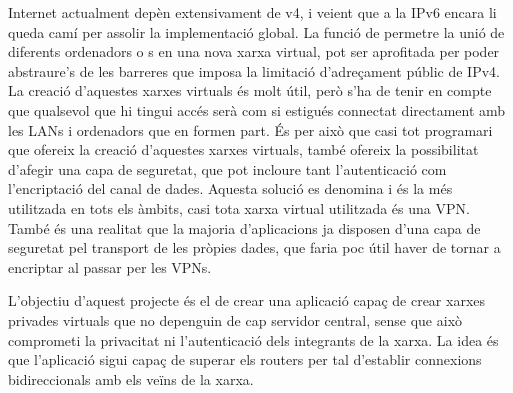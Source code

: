 Internet actualment depèn extensivament de v4, i veient que a la IPv6 encara li queda camí per assolir la implementació global. La funció de permetre la unió de diferents ordenadors o s en una nova xarxa virtual, pot ser aprofitada per poder abstraure's de les barreres que imposa la limitació d'adreçament públic de IPv4. La creació d'aquestes xarxes virtuals és molt útil, però s'ha de tenir en compte que qualsevol que hi tingui accés serà com si estigués connectat directament amb les LANs i ordenadors que en formen part. És per això que casi tot programari que ofereix la creació d'aquestes xarxes virtuals, també ofereix la possibilitat d'afegir una capa de seguretat, que pot incloure tant l'autenticació com l'encriptació del canal de dades. Aquesta solució es denomina  i és la més utilitzada en tots els àmbits, casi tota xarxa virtual utilitzada és una VPN.
També és una realitat que la majoria d'aplicacions ja disposen d'una capa de seguretat pel transport de les pròpies dades, que faria poc útil haver de tornar a encriptar al passar per les VPNs.

L'objectiu d'aquest projecte és el de crear una aplicació capaç de crear xarxes privades virtuals que no depenguin de cap servidor central, sense que això comprometi la privacitat ni l'autenticació dels integrants de la xarxa. La idea és que l'aplicació sigui capaç de superar els routers  per tal d'establir connexions bidireccionals amb els veïns de la xarxa.
